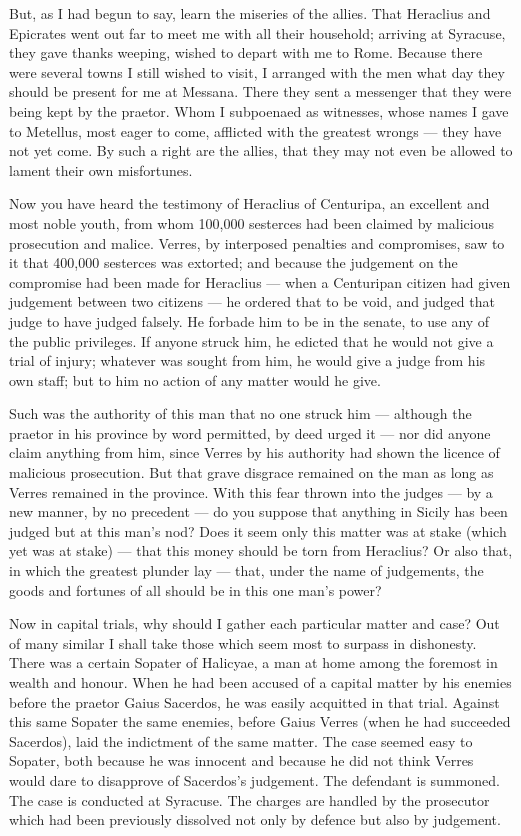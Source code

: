  But, as I had begun to say, learn the miseries of the allies. That Heraclius and Epicrates went out far to meet me with all their household; arriving at Syracuse, they gave thanks weeping, wished to depart with me to Rome. Because there were several towns I still wished to visit, I arranged with the men what day they should be present for me at Messana. There they sent a messenger that they were being kept by the praetor. Whom I subpoenaed as witnesses, whose names I gave to Metellus, most eager to come, afflicted with the greatest wrongs --- they have not yet come. By such a right are the allies, that they may not even be allowed to lament their own misfortunes.

 Now you have heard the testimony of Heraclius of Centuripa, an excellent and most noble youth, from whom 100,000 sesterces had been claimed by malicious prosecution and malice. Verres, by interposed penalties and compromises, saw to it that 400,000 sesterces was extorted; and because the judgement on the compromise had been made for Heraclius --- when a Centuripan citizen had given judgement between two citizens --- he ordered that to be void, and judged that judge to have judged falsely. He forbade him to be in the senate, to use any of the public privileges. If anyone struck him, he edicted that he would not give a trial of injury; whatever was sought from him, he would give a judge from his own staff; but to him no action of any matter would he give.

 Such was the authority of this man that no one struck him --- although the praetor in his province by word permitted, by deed urged it --- nor did anyone claim anything from him, since Verres by his authority had shown the licence of malicious prosecution. But that grave disgrace remained on the man as long as Verres remained in the province. With this fear thrown into the judges --- by a new manner, by no precedent --- do you suppose that anything in Sicily has been judged but at this man's nod? Does it seem only this matter was at stake (which yet was at stake) --- that this money should be torn from Heraclius? Or also that, in which the greatest plunder lay --- that, under the name of judgements, the goods and fortunes of all should be in this one man's power?

 Now in capital trials, why should I gather each particular matter and case? Out of many similar I shall take those which seem most to surpass in dishonesty. There was a certain Sopater of Halicyae, a man at home among the foremost in wealth and honour. When he had been accused of a capital matter by his enemies before the praetor Gaius Sacerdos, he was easily acquitted in that trial. Against this same Sopater the same enemies, before Gaius Verres (when he had succeeded Sacerdos), laid the indictment of the same matter. The case seemed easy to Sopater, both because he was innocent and because he did not think Verres would dare to disapprove of Sacerdos's judgement. The defendant is summoned. The case is conducted at Syracuse. The charges are handled by the prosecutor which had been previously dissolved not only by defence but also by judgement.

